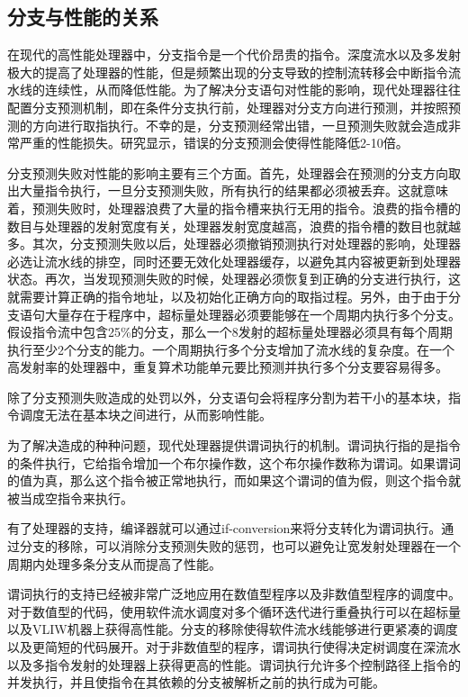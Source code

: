 \subsection{分支与性能的关系}

在现代的高性能处理器中，分支指令是一个代价昂贵的指令\cite{Mahlke1994}。深度流水以及多发射极大的提高了处理器的性能，但是频繁出现的分支导致的控制流转移会中断指令流水线的连续性，从而降低性能。为了解决分支语句对性能的影响，现代处理器往往配置分支预测机制，即在条件分支执行前，处理器对分支方向进行预测，并按照预测的方向进行取指执行。不幸的是，分支预测经常出错，一旦预测失败就会造成非常严重的性能损失。研究显示，错误的分支预测会使得性能降低2-10倍\cite{Smith1989}\cite{Wall1991}\cite{1991}。

分支预测失败对性能的影响主要有三个方面。首先，处理器会在预测的分支方向取出大量指令执行，一旦分支预测失败，所有执行的结果都必须被丢弃。这就意味着，预测失败时，处理器浪费了大量的指令槽来执行无用的指令。浪费的指令槽的数目与处理器的发射宽度有关，处理器发射宽度越高，浪费的指令槽的数目也就越多。其次，分支预测失败以后，处理器必须撤销预测执行对处理器的影响，处理器必选让流水线的排空，同时还要无效化处理器缓存，以避免其内容被更新到处理器状态。再次，当发现预测失败的时候，处理器必须恢复到正确的分支进行执行，这就需要计算正确的指令地址，以及初始化正确方向的取指过程。另外，由于由于分支语句大量存在于程序中，超标量处理器必须要能够在一个周期内执行多个分支。假设指令流中包含25\%的分支，那么一个8发射的超标量处理器必须具有每个周期执行至少2个分支的能力。一个周期执行多个分支增加了流水线的复杂度。在一个高发射率的处理器中，重复算术功能单元要比预测并执行多个分支要容易得多。

除了分支预测失败造成的处罚以外，分支语句会将程序分割为若干小的基本块，指令调度无法在基本块之间进行，从而影响性能。


为了解决造成的种种问题，现代处理器提供谓词执行的机制。谓词执行指的是指令的条件执行，它给指令增加一个布尔操作数，这个布尔操作数称为谓词。如果谓词的值为真，那么这个指令被正常地执行，而如果这个谓词的值为假，则这个指令就被当成空指令来执行。

有了处理器的支持，编译器就可以通过if-conversion来将分支转化为谓词执行。通过分支的移除，可以消除分支预测失败的惩罚，也可以避免让宽发射处理器在一个周期内处理多条分支从而提高了性能。

谓词执行的支持已经被非常广泛地应用在数值型程序以及非数值型程序的调度中\cite{ScottA.Mahlke1992}。对于数值型的代码，使用软件流水调度对多个循环迭代进行重叠执行可以在超标量以及VLIW机器上获得高性能\cite{1989a}\cite{JosephP.Brutt}。分支的移除使得软件流水线能够进行更紧凑的调度以及更简短的代码展开。对于非数值型的程序，谓词执行使得决定树调度在深流水以及多指令发射的处理器上获得更高的性能\cite{Hsu1986}。谓词执行允许多个控制路径上指令的并发执行，并且使指令在其依赖的分支被解析之前的执行成为可能。

